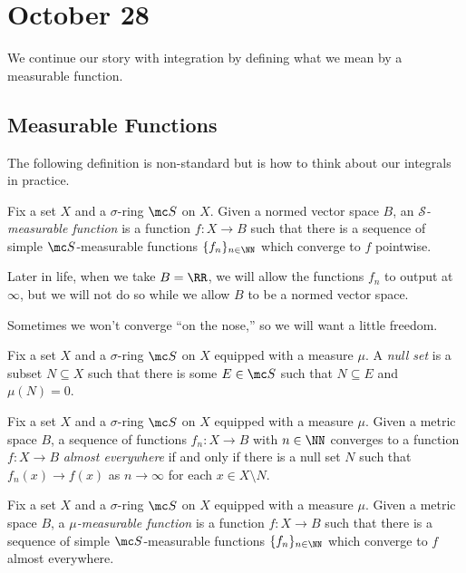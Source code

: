 \documentclass[../notes.tex]{subfiles}
\begin{document}
\section{October 28}

We continue our story with integration by defining what we mean by a measurable function.

\subsection{Measurable Functions}
The following definition is non-standard but is how to think about our integrals in practice.
\begin{definition}
	Fix a set $X$ and a $\sigma$-ring $\mc S$ on $X$. Given a normed vector space $B$, an \textit{$\mathcal S$-measurable function} is a function $f\colon X\to B$ such that there is a sequence of simple $\mc S$-measurable functions $\{f_n\}_{n\in\NN}$ which converge to $f$ pointwise.
\end{definition}
\begin{remark}
	Later in life, when we take $B=\RR$, we will allow the functions $f_n$ to output at $\infty$, but we will not do so while we allow $B$ to be a normed vector space.
\end{remark}
Sometimes we won't converge ``on the nose,'' so we will want a little freedom.
\begin{definition}
	Fix a set $X$ and a $\sigma$-ring $\mc S$ on $X$ equipped with a measure $\mu$. A \textit{null set} is a subset $N\subseteq X$ such that there is some $E\in\mc S$ such that $N\subseteq E$ and $\mu(N)=0$.
\end{definition}
\begin{definition}
	Fix a set $X$ and a $\sigma$-ring $\mc S$ on $X$ equipped with a measure $\mu$. Given a metric space $B$, a sequence of functions $f_n\colon X\to B$ with $n\in\NN$ converges to a function $f\colon X\to B$ \textit{almost everywhere} if and only if there is a null set $N$ such that $f_n(x)\to f(x)$ as $n\to\infty$ for each $x\in X\setminus N$.
\end{definition}
\begin{definition}
	Fix a set $X$ and a $\sigma$-ring $\mc S$ on $X$ equipped with a measure $\mu$. Given a metric space $B$, a \textit{$\mu$-measurable function} is a function $f\colon X\to B$ such that there is a sequence of simple $\mc S$-measurable functions $\{f_n\}_{n\in\NN}$ which converge to $f$ almost everywhere.
\end{definition}
\end{document}
